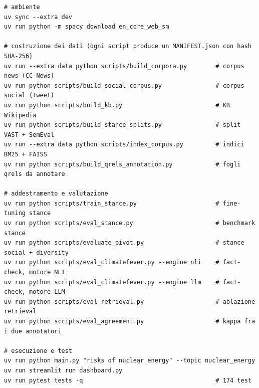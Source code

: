 \documentclass[11pt,a4paper]{report}
\begin{document}
\begin{lstlisting}
# ambiente
uv sync --extra dev
uv run python -m spacy download en_core_web_sm

# costruzione dei dati (ogni script produce un MANIFEST.json con hash SHA-256)
uv run --extra data python scripts/build_corpora.py        # corpus news (CC-News)
uv run python scripts/build_social_corpus.py               # corpus social (tweet)
uv run python scripts/build_kb.py                          # KB Wikipedia
uv run python scripts/build_stance_splits.py               # split VAST + SemEval
uv run --extra data python scripts/index_corpus.py         # indici BM25 + FAISS
uv run python scripts/build_qrels_annotation.py            # fogli qrels da annotare

# addestramento e valutazione
uv run python scripts/train_stance.py                      # fine-tuning stance
uv run python scripts/eval_stance.py                       # benchmark stance
uv run python scripts/evaluate_pivot.py                    # stance social + diversity
uv run python scripts/eval_climatefever.py --engine nli    # fact-check, motore NLI
uv run python scripts/eval_climatefever.py --engine llm    # fact-check, motore LLM
uv run python scripts/eval_retrieval.py                    # ablazione retrieval
uv run python scripts/eval_agreement.py                    # kappa fra i due annotatori

# esecuzione e test
uv run python main.py "risks of nuclear energy" --topic nuclear_energy
uv run streamlit run dashboard.py
uv run pytest tests -q                                     # 174 test
\end{lstlisting}
\end{document}
